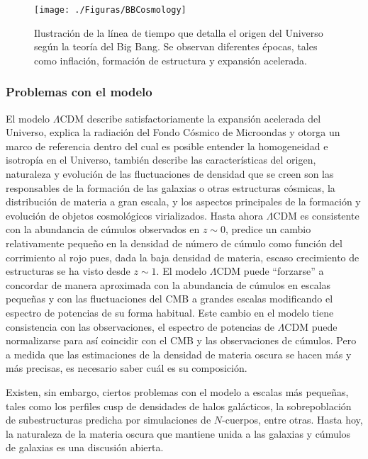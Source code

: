 \documentclass[a4paper,openright,12pt]{book}
\begin{document}
\begin{figure}
\centering
  \texttt{[image: ./Figuras/BBCosmology]}
  \caption{\footnotesize{Ilustración de la línea de tiempo que detalla el origen del Universo según la teoría del Big Bang. Se observan diferentes épocas, tales como inflación, formación de estructura y expansión acelerada.}}
  \label{fig 1.6}
\end{figure}



\subsubsection*{Problemas con el modelo}
El modelo $\Lambda$CDM describe satisfactoriamente la expansión acelerada del Universo, explica la radiación del Fondo Cósmico de Microondas y otorga un marco de referencia dentro del cual es posible entender la homogeneidad e isotropía en el Universo, también describe las características del origen, naturaleza y evolución de las fluctuaciones de densidad que se creen son las responsables de la formación de las galaxias o otras estructuras cósmicas, la distribución de materia a gran escala, y los aspectos principales de la formación y evolución de objetos cosmológicos virializados. Hasta ahora $\Lambda$CDM es consistente con la abundancia de cúmulos observados en $z \sim 0$, predice un cambio relativamente pequeño en la densidad de número de cúmulo como función del corrimiento al rojo pues, dada la baja densidad de materia, escaso crecimiento de estructuras se ha visto desde $z \sim 1$. El modelo $\Lambda$CDM puede ``forzarse'' a concordar de manera aproximada con la abundancia de cúmulos en escalas pequeñas y con las fluctuaciones del CMB a grandes escalas modificando el espectro de potencias de su forma habitual. Este cambio en el modelo tiene consistencia con las observaciones, el espectro de potencias de $\Lambda$CDM puede normalizarse para así coincidir con el CMB y las observaciones de cúmulos. Pero a medida que las estimaciones de la densidad de materia oscura se hacen más y más precisas, es necesario saber cuál es su composición.

Existen, sin embargo, ciertos problemas con el modelo a escalas más pequeñas, tales como los perfiles cusp de densidades de halos galácticos, la sobrepoblación de subestructuras predicha por simulaciones de $N$-cuerpos, entre otras. Hasta hoy, la naturaleza de la materia oscura que mantiene unida a las galaxias y cúmulos de galaxias es una discusión abierta.
\end{document}
